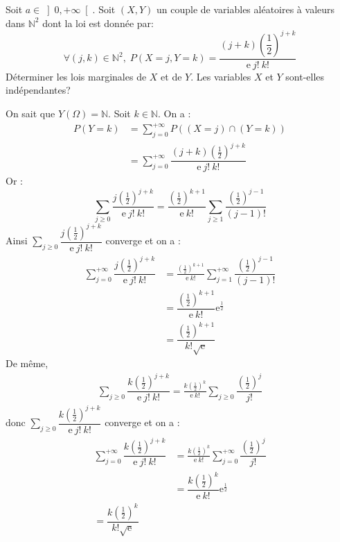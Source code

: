 \documentclass[a4paper,10pt]{report}
\begin{document}
\begin{Exa} Soit $a\in {\left] 0,+\infty\right[ }$. Soit $(X,Y)$ un couple de variables aléatoires à valeurs dans $\mathbb{N}^2$ dont la loi est donnée par: 
$$\forall (j,k)\in {\mathbb{N}^2}, \; P(X=j,Y=k)=\dfrac{(j+k)\left( \dfrac{1}{2}\right) ^{j+k}}{\mathrm{e}\:j!\:k!}$$
Déterminer les lois marginales de $X$ et de $Y$. Les variables $X$ et $Y$ sont-elles indépendantes?
\end{Exa}

\corr On sait que $Y(\Omega)=\mathbb{N}$. Soit $k\in\mathbb{N}$. On a :
\begin{align*}
 P(Y=k)& =\displaystyle\sum\limits_{j=0}^{+\infty} P((X=j) \cap (Y=k)) \\
 & =\displaystyle\sum\limits_{j=0}^{+\infty}\dfrac{(j+k)\left( \tfrac{1}{2}\right) ^{j+k}}{\text{e}\:j!\:k!}
 \end{align*}
Or :
 $$\displaystyle\sum\limits_{j\geq 0}^{}\dfrac{j\left(\tfrac{1}{2} \right) ^{j+k}}{\text{e}\:j!\:k!}=\dfrac{\left(\tfrac{1}{2} \right)^{k+1}}{\text{e}\:k!}\displaystyle\sum\limits_{j\geq 1}^{}\dfrac{\left(\tfrac{1}{2} \right)^{j-1}}{(j-1)!}$$
Ainsi $\displaystyle\sum\limits_{j\geq 0}^{}\dfrac{j\left(\tfrac{1}{2} \right)^{j+k}}{\text{e}\:j!\:k!}$ converge et on a :
\begin{align*}
\sum\limits_{j=0}^{+\infty}\dfrac{j\left(\tfrac{1}{2} \right)^{j+k}}{\text{e}\:j!\:k!}& =\frac{\left(\tfrac{1}{2} \right)^{k+1}}{\text{e}\:k!}\displaystyle\sum\limits_{j=1}^{+\infty}\dfrac{\left(\tfrac{1}{2} \right)^{j-1}}{(j-1)!} \\
& =\dfrac{\left(\tfrac{1}{2} \right)^{k+1}}{\text{e}\:k!}\text{e}^{\tfrac{1}{2}} \\
& =\dfrac{\left(\tfrac{1}{2} \right)^{k+1}}{k!\sqrt{\mathrm{e}}}
\end{align*}
De même,  
\begin{align*}
\displaystyle\sum\limits_{j\geq 0}^{}\dfrac{k\left(\tfrac{1}{2} \right)^{j+k}}{\text{e}\:j!\:k!}=\frac{k\left(\tfrac{1}{2} \right)^{k}}{\text{e}\:k!}\displaystyle\sum\limits_{j\geq 0}^{}\dfrac{\left(\tfrac{1}{2} \right)^{j}}{j!}
\end{align*}
donc $\displaystyle\sum\limits_{j\geq 0}^{}\dfrac{k\left(\tfrac{1}{2} \right)^{j+k}}{\text{e}\:j!\:k!}$ converge et on a :
\begin{align*}
\displaystyle\sum\limits_{j=0}^{+\infty}\dfrac{k\left(\tfrac{1}{2} \right)^{j+k}}{\text{e}\:j!\:k!}& =\frac{k\left(\tfrac{1}{2} \right)^{k}}{\text{e}\:k!}\displaystyle\sum\limits_{j=0}^{+\infty}\dfrac{\left(\tfrac{1}{2} \right)^{j}}{j!} \\
& =\dfrac{k\left(\tfrac{1}{2} \right)^{k}}{\text{e}\:k!}\text{e}^{\tfrac{1}{2}}\\
=\dfrac{k\left(\tfrac{1}{2} \right)^{k}}{k!\sqrt{\mathrm{e}}}
\end{align*}
\end{document}
